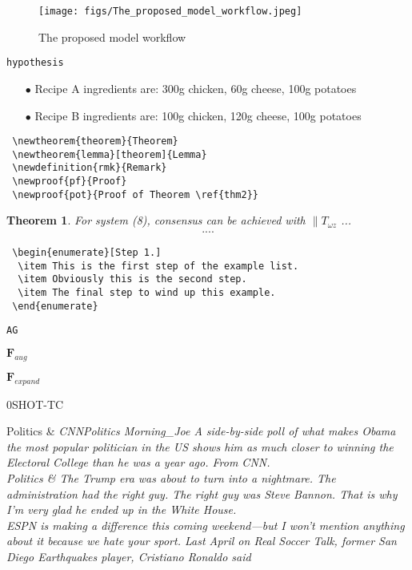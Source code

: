 \begin{figure}
	\centering
		\texttt{[image: figs/The\_proposed\_model\_workflow.jpeg]}
	\caption{The proposed model workflow}
	\label{model_workflow}
\end{figure}


{\verb|hypothesis|}


\begin{enumerate}
\item[$\bullet$] Recipe A ingredients are: 300g chicken, 60g cheese, 100g potatoes
\item[$\bullet$] Recipe B ingredients are: 100g chicken, 120g cheese, 100g potatoes
\end{enumerate}


\begin{verbatim}
 \newtheorem{theorem}{Theorem}
 \newtheorem{lemma}[theorem]{Lemma}
 \newdefinition{rmk}{Remark}
 \newproof{pf}{Proof}
 \newproof{pot}{Proof of Theorem \ref{thm2}}
\end{verbatim}


\newtheorem{theorem}{Theorem}

\begin{theorem}
For system (8), consensus can be achieved with 
$\|T_{\omega z}$ ...
\begin{eqnarray}\label{10}
....
\end{eqnarray}
\end{theorem}


\begin{verbatim}
 \begin{enumerate}[Step 1.]
  \item This is the first step of the example list.
  \item Obviously this is the second step.
  \item The final step to wind up this example.
 \end{enumerate}
\end{verbatim}





{\verb|AG|}


$\mathbf{F}_{aug}$

$\mathbf{F}_{expand}$


\textsc{0SHOT-TC}



{Politics} &  \itshape{CNNPolitics Morning_Joe A side-by-side poll of what makes Obama the most popular politician in the US shows him as much closer to winning the Electoral College than he was a year ago. From CNN.} \\
{Politics}  & \itshape{The Trump era was about to turn into a nightmare. The administration had the right guy. The right guy was Steve Bannon. That is why I'm very glad he ended up in the White House.} \\


ESPN is making a difference this coming weekend—but I won't mention anything about it because we hate your sport. Last April on Real Soccer Talk, former San Diego Earthquakes player, Cristiano Ronaldo said
